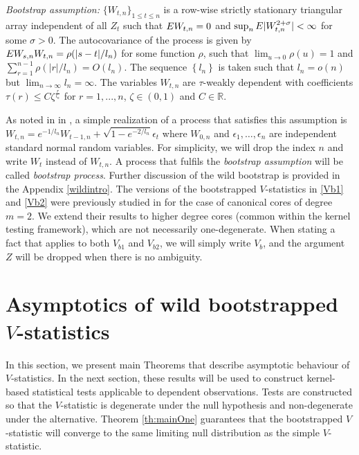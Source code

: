 \emph{Bootstrap assumption:} $\{W_{t,n}\}_{1 \leq t \leq n }$ is a row-wise strictly stationary triangular array independent of all $Z_t$ such that $E W_{t,n}=0$ and $\sup_{n} E|W_{t,n}^{2+\sigma}| < \infty$ for some $\sigma > 0$. The autocovariance of the process is given by $E W_{s,n} W_{t,n}=\rho(|s-t|/l_n)$ for some function $\rho$, such that $\lim_{u \to 0} \rho(u) = 1$ and $\sum_{r=1}^{n-1} \rho(|r|/l_n)= O(l_n)$. The sequence $\left\{l_n\right\}$ is taken such that $l_n=o(n)$ but $\lim_{n \to \infty} l_n = \infty$. The variables $W_{t,n}$  are $\tau$-weakly dependent with coefficients $\tau(r) \leq C \zeta^{\frac{r} {l_n}}$ for $r=1,...,n$, $\zeta \in (0,1)$ and $C\in\mathbb R$.

As noted in in \cite[Remark 2]{leucht_dependent_2013}, a simple realization of a process that satisfies this assumption is $W_{t,n} = e^{-1/l_n}W_{t-1,n} + \sqrt{1 -e^{-2/l_n}} \epsilon_t$
where $W_{0,n}$ and $\epsilon_1,\ldots,\epsilon_n$ are independent standard normal random variables. For simplicity, we will drop the index $n$ and write $W_t$ instead of $W_{t,n}$. A process that fulfils the \emph{bootstrap assumption} will be called  \emph{bootstrap process}. Further discussion of the wild bootstrap is provided in the Appendix  \ref{wildintro}.
The versions of the bootstrapped $V$-statistics in \eqref{Vb1} and \eqref{Vb2} were previously studied in \cite{leucht_dependent_2013} for the case of canonical cores of degree $m=2$. We extend their results to higher degree cores (common within the kernel testing framework), which are not necessarily one-degenerate. When stating a fact that applies to both $V_{b1}$ and $V_{b2}$, we will simply write $V_b$, and the argument $Z$ will be dropped when there is no ambiguity. 
\section{Asymptotics of wild bootstrapped $V$-statistics}\label{sec:main}
In this section, we present main Theorems that describe asymptotic behaviour of $V$-statistics. In the next section, these results will be used to construct kernel-based statistical tests applicable to dependent observations. Tests are constructed so that the  $V$-statistic is degenerate under the null hypothesis and non-degenerate under the alternative. Theorem \ref{th:mainOne} guarantees that the bootstrapped $V$-statistic will converge to the same limiting null distribution as the simple $V$-statistic. 

